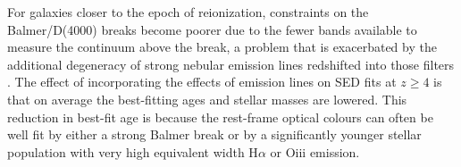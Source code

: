     
For galaxies closer to the epoch of reionization, constraints on the Balmer/D(4000) breaks become poorer due to the fewer bands available to measure the continuum above the break, a problem that is exacerbated by the additional degeneracy of strong nebular emission lines redshifted into those filters \citep{2009A&A...502..423S,2010A&A...515A..73S}. The effect of incorporating the effects of emission lines on SED fits at $z \geq 4$ is that on average the best-fitting ages and stellar masses are lowered. This reduction in best-fit age is because the rest-frame optical colours can often be well fit by either a strong Balmer break or by a significantly younger stellar population with very high equivalent width H$\alpha$ or {\sc Oiii} emission. 


